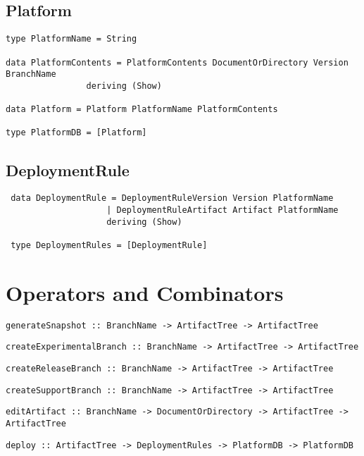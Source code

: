 \documentclass[11pt]{article}
\newcommand{\RevisionNeeded}{\bigskip\noindent\fbox{
\textbf{Be prepared to revise this section \emph{many} times!}}}
\begin{document}

\subsection{Platform}
 \begin{lstlisting}
type PlatformName = String

data PlatformContents = PlatformContents DocumentOrDirectory Version BranchName
                deriving (Show)
 
data Platform = Platform PlatformName PlatformContents

type PlatformDB = [Platform]
 \end{lstlisting}
 
\subsection{DeploymentRule}

 \begin{lstlisting}
 data DeploymentRule = DeploymentRuleVersion Version PlatformName
                    | DeploymentRuleArtifact Artifact PlatformName
                    deriving (Show)
 
 type DeploymentRules = [DeploymentRule]

 \end{lstlisting}
 

\section{Operators and Combinators}
\label{sec:comb}

%

\begin{lstlisting}[style=Haskell]
generateSnapshot :: BranchName -> ArtifactTree -> ArtifactTree
\end{lstlisting}
\begin{lstlisting}[style=Haskell]
createExperimentalBranch :: BranchName -> ArtifactTree -> ArtifactTree
\end{lstlisting}
\begin{lstlisting}[style=Haskell]
createReleaseBranch :: BranchName -> ArtifactTree -> ArtifactTree
\end{lstlisting}
\begin{lstlisting}[style=Haskell]
createSupportBranch :: BranchName -> ArtifactTree -> ArtifactTree
\end{lstlisting}
\begin{lstlisting}[style=Haskell]
editArtifact :: BranchName -> DocumentOrDirectory -> ArtifactTree -> ArtifactTree
\end{lstlisting}
\begin{lstlisting}[style=Haskell]
deploy :: ArtifactTree -> DeploymentRules -> PlatformDB -> PlatformDB
\end{lstlisting}
\end{document}

